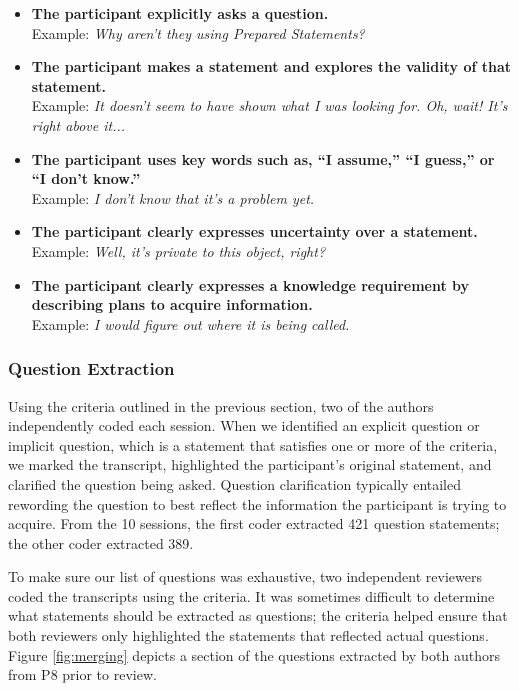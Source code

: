 \documentclass[conference]{IEEEtran}
\begin{document}
\begin{itemize}
\item \textbf{The participant explicitly asks a question.}
\\ Example: \textit{Why aren't they using Prepared Statements?}
\item \textbf{The participant makes a statement and explores the validity of that statement.}
\\ Example: \textit{It doesn't seem to have shown what I was looking for. Oh, wait! It's right above it...}
\item \textbf{The participant uses key words such as, ``I assume,'' ``I guess,'' or ``I don't know.''}
\\ Example: \textit{I don't know that it's a problem yet.}
\item \textbf{The participant clearly expresses uncertainty over a statement.}
\\ Example: \textit{Well, it's private to this object, right?}
\item \textbf{The participant clearly expresses a knowledge requirement by describing plans to acquire information.}
\\ Example: \textit{I would figure out where it is being called.}

\end{itemize}

\subsubsection{Question Extraction}
Using the criteria outlined in the previous section, two of the authors independently coded each session. 
When we identified an explicit question or implicit question, which is a statement that satisfies one or more of the criteria, we marked the transcript, highlighted the participant's original statement, and clarified the question being asked.
Question clarification typically entailed rewording the question to best reflect the information the participant is trying to acquire.
From the 10 sessions, the first coder extracted 421 question statements; the other coder extracted 389. 

To make sure our list of questions was exhaustive, two independent reviewers coded the transcripts using the criteria.
It was sometimes difficult to determine what statements should be extracted as questions; the criteria helped ensure that both reviewers only highlighted the statements that reflected actual questions.
Figure \ref{fig:merging} depicts a section of the questions extracted by both authors from P8 prior to review.
\end{document}
